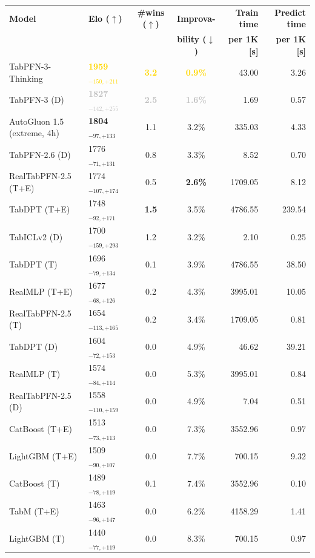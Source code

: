 \begin{tabular}{llccrr}
\toprule
\textbf{Model} & \textbf{Elo ($\uparrow$)} & \textbf{\#wins ($\uparrow$)} & \textbf{Improva-} & \textbf{Train time} & \textbf{Predict time} \\
 &  &  & \textbf{bility ($\downarrow$)} & \textbf{per 1K [s]} & \textbf{per 1K [s]} \\
\midrule
TabPFN-3-Thinking & \textcolor{gold}{\textbf{1959${}_{-150,+211}$}} & \textcolor{gold}{\textbf{3.2}} & \textcolor{gold}{\textbf{0.9\%}} & 43.00 & 3.26 \\
TabPFN-3 (D) & \textcolor{silver}{\textbf{1827${}_{-142,+255}$}} & \textcolor{silver}{\textbf{2.5}} & \textcolor{silver}{\textbf{1.6\%}} & 1.69 & 0.57 \\
AutoGluon 1.5 (extreme, 4h) & \textcolor{bronze}{\textbf{1804${}_{-97,+133}$}} & 1.1 & 3.2\% & 335.03 & 4.33 \\
TabPFN-2.6 (D) & 1776${}_{-71,+131}$ & 0.8 & 3.3\% & 8.52 & 0.70 \\
RealTabPFN-2.5 (T+E) & 1774${}_{-107,+174}$ & 0.5 & \textcolor{bronze}{\textbf{2.6\%}} & 1709.05 & 8.12 \\
TabDPT (T+E) & 1748${}_{-92,+171}$ & \textcolor{bronze}{\textbf{1.5}} & 3.5\% & 4786.55 & 239.54 \\
TabICLv2 (D) & 1700${}_{-159,+293}$ & 1.2 & 3.2\% & 2.10 & 0.25 \\
TabDPT (T) & 1696${}_{-79,+134}$ & 0.1 & 3.9\% & 4786.55 & 38.50 \\
RealMLP (T+E) & 1677${}_{-68,+126}$ & 0.2 & 4.3\% & 3995.01 & 10.05 \\
RealTabPFN-2.5 (T) & 1654${}_{-113,+165}$ & 0.2 & 3.4\% & 1709.05 & 0.81 \\
TabDPT (D) & 1604${}_{-72,+153}$ & 0.0 & 4.9\% & 46.62 & 39.21 \\
RealMLP (T) & 1574${}_{-84,+114}$ & 0.0 & 5.3\% & 3995.01 & 0.84 \\
RealTabPFN-2.5 (D) & 1558${}_{-110,+159}$ & 0.0 & 4.9\% & 7.04 & 0.51 \\
CatBoost (T+E) & 1513${}_{-73,+113}$ & 0.0 & 7.3\% & 3552.96 & 0.97 \\
LightGBM (T+E) & 1509${}_{-90,+107}$ & 0.0 & 7.7\% & 700.15 & 9.32 \\
CatBoost (T) & 1489${}_{-78,+119}$ & 0.1 & 7.4\% & 3552.96 & 0.10 \\
TabM (T+E) & 1463${}_{-96,+147}$ & 0.0 & 6.2\% & 4158.29 & 1.41 \\
LightGBM (T) & 1440${}_{-77,+119}$ & 0.0 & 8.3\% & 700.15 & 0.97 \\

\end{tabular}
